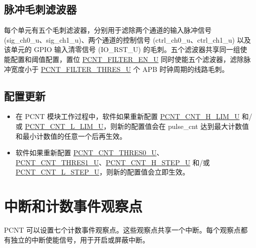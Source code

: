 \documentclass[main\_\_CN.tex]{subfiles}
\begin{document}
\subsection{脉冲毛刺滤波器}

每个单元有五个毛刺滤波器，分别用于滤除两个通道的输入脉冲信号 (sig\_ch0\_u、sig\_ch1\_u)、两个通道的控制信号 (ctrl\_ch0\_u、ctrl\_ch1\_u) 以及该单元的 GPIO 输入清零信号 (IO\_RST\_U) 的毛刺。五个滤波器共享同一组使能配置和阈值配置，置位 \hyperref[fielddesc:PCNTFILTERENUN]{PCNT\_FILTER\_EN\_U} 同时使能五个滤波器，滤除脉冲宽度小于 \hyperref[fielddesc:PCNTFILTERTHRESUN]{PCNT\_FILTER\_THRES\_U} 个 APB 时钟周期的线路毛刺。

\subsection{配置更新}

\begin{itemize}

\item 在 PCNT 模块工作过程中，软件如果重新配置 \hyperref[fielddesc:PCNTCNTHLIMUN]{PCNT\_CNT\_H\_LIM\_U} 和/或 \hyperref[fielddesc:PCNTCNTLLIMUN]{PCNT\_CNT\_L\_LIM\_U}，则新的配置值会在 pulse\_cnt 达到最大计数值和最小计数值的任意一个后再生效。

\item 软件如果重新配置 \hyperref[fielddesc:PCNTCNTTHRES0UN]{PCNT\_CNT\_THRES0\_U}、\hyperref[fielddesc:PCNTCNTTHRES1UN]{PCNT\_CNT\_THRES1\_U}、\hyperref[fielddesc:PCNTCNTHSTEPUN]{PCNT\_CNT\_H\_STEP\_U} 和/或 \hyperref[fielddesc:PCNTCNTLSTEPUN]{PCNT\_CNT\_L\_STEP\_U}，则新的配置值会立即生效。
\end{itemize}

\section{中断和计数事件观察点}

PCNT 可以设置七个计数事件观察点。这些观察点共享一个中断。每个观察点都有独立的中断使能信号，用于开启或屏蔽中断。
\end{document}

